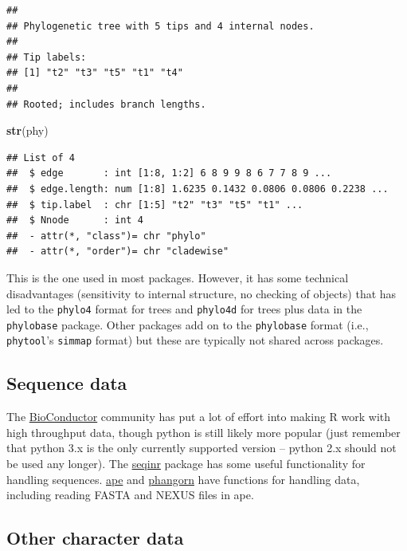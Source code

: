 \documentclass[
]{article}
\newenvironment{Shaded}{\begin{snugshade}}{\end{snugshade}}
\newcommand{\KeywordTok}[1]{\textcolor[rgb]{0.13,0.29,0.53}{\textbf{#1}}}
\newcommand{\NormalTok}[1]{#1}
\begin{document}
\begin{verbatim}
## 
## Phylogenetic tree with 5 tips and 4 internal nodes.
## 
## Tip labels:
## [1] "t2" "t3" "t5" "t1" "t4"
## 
## Rooted; includes branch lengths.
\end{verbatim}

\begin{Shaded}
\begin{Highlighting}[]
\KeywordTok{str}\NormalTok{(phy)}
\end{Highlighting}
\end{Shaded}

\begin{verbatim}
## List of 4
##  $ edge       : int [1:8, 1:2] 6 8 9 9 8 6 7 7 8 9 ...
##  $ edge.length: num [1:8] 1.6235 0.1432 0.0806 0.0806 0.2238 ...
##  $ tip.label  : chr [1:5] "t2" "t3" "t5" "t1" ...
##  $ Nnode      : int 4
##  - attr(*, "class")= chr "phylo"
##  - attr(*, "order")= chr "cladewise"
\end{verbatim}

This is the one used in most packages. However, it has some technical disadvantages (sensitivity to internal structure, no checking of objects) that has led to the \texttt{phylo4} format for trees and \texttt{phylo4d} for trees plus data in the \texttt{phylobase} package. Other packages add on to the \texttt{phylobase} format (i.e., \texttt{phytool}'s \texttt{simmap} format) but these are typically not shared across packages.

\hypertarget{sequence-data}{%
\subsection{Sequence data}\label{sequence-data}}

The \href{https://www.bioconductor.org/}{BioConductor} community has put a lot of effort into making R work with high throughput data, though python is still likely more popular (just remember that python 3.x is the only currently supported version -- python 2.x should not be used any longer). The \href{http://seqinr.r-forge.r-project.org/}{seqinr} package has some useful functionality for handling sequences. \href{https://www.rdocumentation.org/packages/ape/}{ape} and \href{https://github.com/KlausVigo/phangorn}{phangorn} have functions for handling data, including reading FASTA and NEXUS files in ape.

\hypertarget{other-character-data}{%
\subsection{Other character data}\label{other-character-data}}
\end{document}
